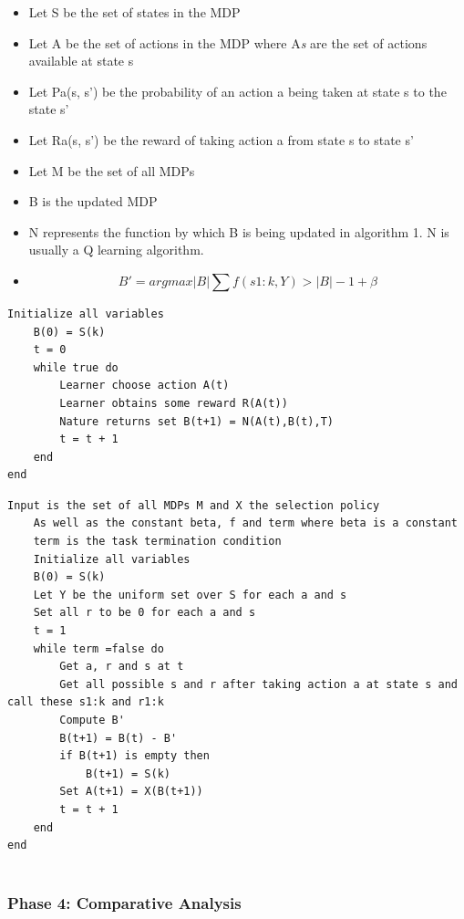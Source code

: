 \documentclass[11pt]{article}
\begin{document}
\begin{itemize}
	\item Let S be the set of states in the MDP
	\item Let A be the set of actions in the MDP where A\textit{s} are the set of actions available at state s
	\item Let Pa(s, s') be the probability of an action a being taken at state s to the state s'
	\item Let Ra(s, s') be the reward of taking action a from state s to state s'
	\item Let M be the set of all MDPs
	\item B is the updated MDP
	\item N represents the function by which B is being updated in algorithm 1. N is usually a Q learning algorithm.
	\item  
	\begin{equation}
	B' =  argmax{|B| \sum f(s1:k, Y) > |B| - 1 + \beta}
	\end{equation}
	
\end{itemize}

\clearpage

\begin{lstlisting}[label=Algorithm,caption=Algorithm 1: MDP update]
	Initialize all variables
	B(0) = S(k)
	t = 0
	while true do
		Learner choose action A(t)
		Learner obtains some reward R(A(t))
		Nature returns set B(t+1) = N(A(t),B(t),T)
		t = t + 1
	end
end
\end{lstlisting}
\begin{lstlisting}[label=Algorithm,caption=Algorithm 2: Online Interact]
	Input is the set of all MDPs M and X the selection policy
	As well as the constant beta, f and term where beta is a constant
	term is the task termination condition
	Initialize all variables
	B(0) = S(k)
	Let Y be the uniform set over S for each a and s
	Set all r to be 0 for each a and s
	t = 1
	while term =false do
		Get a, r and s at t
		Get all possible s and r after taking action a at state s and call these s1:k and r1:k
		Compute B'
		B(t+1) = B(t) - B'
		if B(t+1) is empty then
			B(t+1) = S(k)
		Set A(t+1) = X(B(t+1))
		t = t + 1
	end
end
	
\end{lstlisting}

\vspace{6.0 mm}
\subsubsection{Phase 4: Comparative Analysis}
\end{document}

